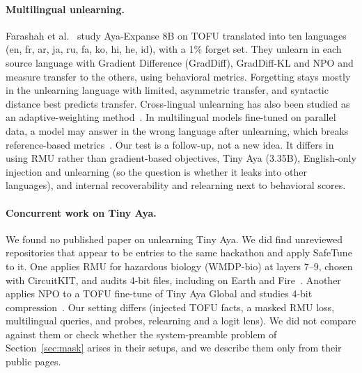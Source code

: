 \documentclass[10pt,twocolumn]{article}
\begin{document}
\paragraph{Multilingual unlearning.} Farashah et al.~\cite{farashah2026amnesia} study Aya-Expanse 8B on TOFU translated into ten languages (en, fr, ar, ja, ru, fa, ko, hi, he, id), with a 1\% forget set. They unlearn in each source language with Gradient Difference (GradDiff), GradDiff-KL and NPO and measure transfer to the others, using behavioral metrics. Forgetting stays mostly in the unlearning language with limited, asymmetric transfer, and syntactic distance best predicts transfer. Cross-lingual unlearning has also been studied as an adaptive-weighting method~\cite{choi2024crosslingual}. In multilingual models fine-tuned on parallel data, a model may answer in the wrong language after unlearning, which breaks reference-based metrics~\cite{hwang2025englishonly}. Our test is a follow-up, not a new idea. It differs in using RMU rather than gradient-based objectives, Tiny Aya (3.35B), English-only injection and unlearning (so the question is whether it leaks into other languages), and internal recoverability and relearning next to behavioral scores.

\paragraph{Concurrent work on Tiny Aya.} We found no published paper on unlearning Tiny Aya. We did find unreviewed repositories that appear to be entries to the same hackathon and apply SafeTune to it. One applies RMU for hazardous biology (WMDP-bio) at layers 7--9, chosen with CircuitKIT, and audits 4-bit files, including on Earth and Fire~\cite{relapse2026}. Another applies NPO to a TOFU fine-tune of Tiny Aya Global and studies 4-bit compression~\cite{tinyaya4bit2026}. Our setting differs (injected TOFU facts, a masked RMU loss, multilingual queries, and probes, relearning and a logit lens). We did not compare against them or check whether the system-preamble problem of Section~\ref{sec:mask} arises in their setups, and we describe them only from their public pages.
\end{document}
